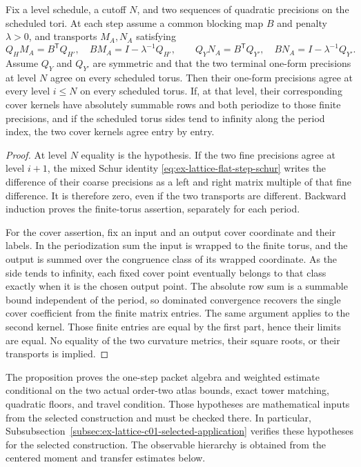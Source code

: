 \begin{lemma}
\label{lem:ex-lattice-flat-same-output}
Fix a level schedule, a cutoff $N$, and two sequences of quadratic
precisions on the scheduled tori. At each step assume a common blocking
map $B$ and penalty $\lambda>0$, and transports $M_A,N_A$ satisfying
\[
 Q_HM_A=B^{\mathsf T}Q_{H'},\quad BM_A=I-\lambda^{-1}Q_{H'},\qquad
 Q_YN_A=B^{\mathsf T}Q_{Y'},\quad BN_A=I-\lambda^{-1}Q_{Y'}.
\]
Assume $Q_Y$ and $Q_{Y'}$ are symmetric and that the two terminal
one-form precisions at level $N$ agree on every scheduled torus. Then their
one-form precisions agree at every level $i\leq N$ on every scheduled
torus. If, at that level, their corresponding cover kernels have absolutely
summable rows and both periodize to those finite precisions, and if the
scheduled torus sides tend to infinity along the period index, the two
cover kernels agree entry by entry.
\end{lemma}

\begin{proof}
At level $N$ equality is the hypothesis. If the two fine precisions agree
at level $i+1$, the mixed Schur identity
\eqref{eq:ex-lattice-flat-step-schur} writes the difference of their coarse
precisions as a left and right matrix multiple of that fine difference.
It is therefore zero, even if the two transports are different. Backward
induction proves the finite-torus assertion, separately for each period.

For the cover assertion, fix an input and an output cover coordinate and
their labels. In the periodization sum the input is wrapped to the finite
torus, and the output is summed over the congruence class of its wrapped
coordinate. As the side tends to infinity, each fixed cover point eventually
belongs to that class exactly when it is the chosen output point. The
absolute row sum is a summable bound independent of the period, so dominated
convergence recovers the single cover coefficient from the finite matrix
entries. The same argument applies to the second kernel. Those finite entries
are equal by the first part, hence their limits are equal. No equality of
the two curvature metrics, their square roots, or their transports is implied.
\end{proof}

\begin{remark}
The proposition proves the one-step packet algebra and weighted estimate
conditional on the two actual order-two atlas bounds, exact tower matching,
quadratic floors, and travel condition. Those hypotheses are mathematical
inputs from the selected construction and must be checked there. In particular,
Subsubsection~\ref{subsec:ex-lattice-c01-selected-application} verifies
these hypotheses for the selected construction. The observable hierarchy
is obtained from the centered moment and transfer estimates below.
\label{rem:ex-lattice-flat-step-inputs}
\end{remark}
